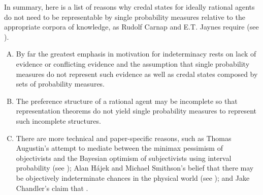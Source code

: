 \documentclass[11pt]{article}
\begin{document}





In summary, here is a list of reasons why credal states for ideally
rational agents do not need to be representable by single probability
measures relative to the appropriate corpora of knowledge, as Rudolf
Carnap and E.T. Jaynes require (see ). 

\begin{enumerate}[(A)]
\item By far the greatest emphasis in motivation for indeterminacy
  rests on lack of evidence or conflicting evidence and the assumption
  that single probability measures do not represent such evidence as
  well as credal states composed by sets of probability measures.
\item The preference structure of a rational agent may be incomplete
  so that representation theorems do not yield single probability
  measures to represent such incomplete structures.
\item There are more technical and paper-specific reasons, such as
  Thomas Augustin's attempt to mediate between the minimax pessimism
  of objectivists and the Bayesian optimism of subjectivists using
  interval probability (see ); Alan
  H{\'a}jek and Michael Smithson's belief that there may be
  objectively indeterminate chances in the physical world (see
  ); and Jake Chandler's claim that
   .
\end{enumerate}
\end{document}
